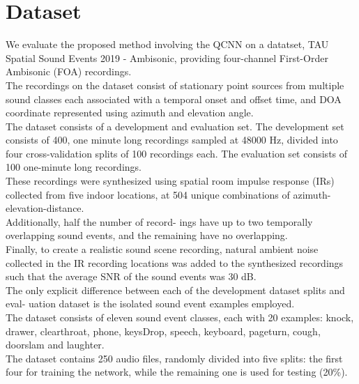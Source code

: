 \documentclass{article}
\begin{document}
    \section{Dataset}
    We evaluate the proposed method involving the QCNN on a datatset, TAU Spatial Sound Events 2019 - Ambisonic, providing four-channel First-Order Ambisonic (FOA) recordings.\\
    The recordings on the dataset consist of stationary point sources from multiple sound classes each associated with a temporal onset and offset time, and DOA coordinate represented using azimuth and elevation angle.\\
    The dataset consists of a development and evaluation set.  The development set consists of 400, one minute long recordings sampled at 48000 Hz, divided into four cross-validation splits of 100 recordings each. The evaluation set consists of 100 one-minute long recordings.\\
    These recordings were synthesized using spatial room impulse response (IRs) collected from five indoor locations, at 504 unique combinations of azimuth-elevation-distance. \\
    Additionally, half the number of record- ings have up to two temporally overlapping sound events, and the remaining have no overlapping.\\
    Finally, to create a realistic sound scene recording, natural ambient noise collected in the IR recording locations was added to the synthesized recordings such that the average SNR of the sound events was 30 dB.\\
    The only explicit difference between each of the development dataset splits and eval- uation dataset is the isolated sound event examples employed.\\
    The dataset consists of eleven sound event classes, each with 20 examples: knock, drawer, clearthroat, phone, keysDrop,  speech, keyboard, pageturn, cough, doorslam and laughter.\\
    The dataset contains 250 audio files, randomly divided into five splits: the first four for training the network, while the remaining one is used for testing (20\%).
\end{document}
